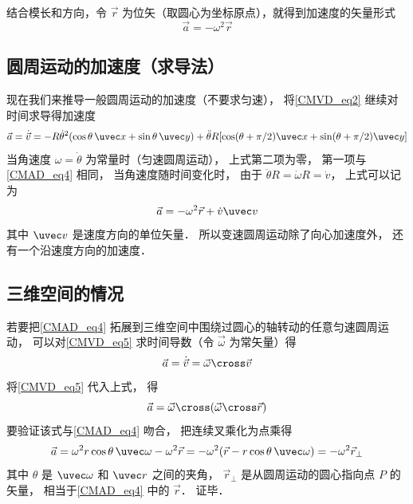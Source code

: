 结合模长和方向，令 $\vec r$ 为位矢（取圆心为坐标原点），就得到加速度的矢量形式
\begin{equation}\label{CMAD_eq4}
\vec a =  - \omega ^2 \vec r
\end{equation}

\subsection{圆周运动的加速度（求导法）}
现在我们来推导一般圆周运动的加速度（不要求匀速），  将\autoref{CMVD_eq2} 继续对时间求导得加速度
\begin{equation}
\vec a = \dot {\vec v} =  - R \dot\theta^2(\cos \theta\, \uvec x + \sin \theta\, \uvec y) + \ddot\theta R [\cos(\theta + \pi/2) \uvec x + \sin(\theta + \pi/2)\uvec y]
\end{equation}
当角速度 $\omega = \dot\theta$ 为常量时（匀速圆周运动）， 上式第二项为零， 第一项与\autoref{CMAD_eq4} 相同， 当角速度随时间变化时， 由于 $\ddot\theta R = \dot\omega R = \dot v$， 上式可以记为
\begin{equation}\label{CMAD_eq6}
\vec a = - \omega ^2 \vec r + \dot v \uvec v
\end{equation}
其中 $\uvec v$ 是速度方向的单位矢量． 所以变速圆周运动除了向心加速度外， 还有一个沿速度方向的加速度．

\subsection{三维空间的情况}

若要把\autoref{CMAD_eq4} 拓展到三维空间中围绕过圆心的轴转动的任意匀速圆周运动， 可以对\autoref{CMVD_eq5} 求时间导数（令 $\vec\omega$ 为常矢量）得
\begin{equation}\label{CMAD_eq7}
\vec a = \dot{\vec v} = \vec\omega \cross \vec v
\end{equation}
将\autoref{CMVD_eq5} 代入上式， 得
\begin{equation}\label{CMAD_eq9}
\vec a =  \vec\omega \cross (\vec\omega \cross \vec r)
\end{equation}
要验证该式与\autoref{CMAD_eq4} 吻合， 把连续叉乘化为点乘得
\begin{equation}
\vec a = \omega^2 r \cos\theta\, \uvec \omega - \omega^2 \vec r = -\omega^2 (\vec r - r\cos\theta\, \uvec\omega) = -\omega^2 \vec r_\bot
\end{equation}
其中 $\theta$ 是 $\uvec\omega$ 和 $\uvec r$ 之间的夹角， $\vec r_\bot$ 是从圆周运动的圆心指向点 $P$ 的矢量， 相当于\autoref{CMAD_eq4} 中的 $\vec r$． 证毕．

